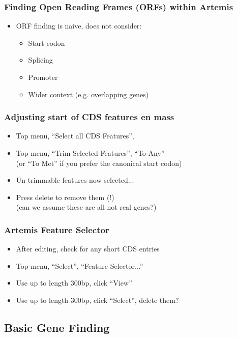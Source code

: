 \documentclass[table]{beamer}
\begin{document}
\begin{frame}
    \frametitle{Finding Open Reading Frames (ORFs) within Artemis}
    \begin{itemize}
      \item<1-> ORF finding is naive, does not consider:
      \begin{itemize}
        \item Start codon
        \item Splicing
        \item Promoter
        \item Wider context (e.g. overlapping genes)
      \end{itemize}
    \end{itemize}
\end{frame}

\begin{frame}
    \frametitle{Adjusting start of CDS features en mass}
    \begin{itemize}
      \item<1-> Top menu, ``Select all CDS Features'',
      \item<1-> Top menu, ``Trim Selected Features'', ``To Any'' \\
           (or ``To Met'' if you prefer the canonical start codon)
      \item<2-> Un-trimmable features now selected...
      \item<2-> Press delete to remove them (!) \\
           (can we assume these are all not real genes?)
    \end{itemize}
\end{frame}

\begin{frame}
    \frametitle{Artemis Feature Selector}
    \begin{itemize}
	  \item<1-> After editing, check for any short CDS entries
	  \item<1-> Top menu, ``Select'', ``Feature Selector...''
	  \item<1-> Use up to length 300bp, click ``View''
	  \item<1-> Use up to length 300bp, click ``Select'', delete them?
    \end{itemize}
\end{frame}

\subsection{Basic Gene Finding}
\end{document}
